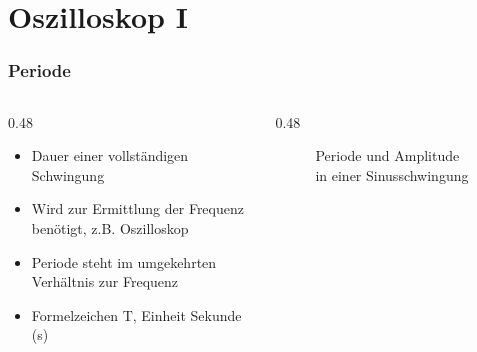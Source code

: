 
\section{Oszilloskop I}
\label{section:oszilloskop_1}
\begin{frame}%

\frametitle{Periode}
    \begin{columns}
        \begin{column}{0.48\textwidth}
            \begin{itemize}[<+->]
                \item Dauer einer vollständigen Schwingung
                \item Wird zur Ermittlung der Frequenz benötigt, z.B. Oszilloskop
                \item Periode steht im umgekehrten Verhältnis zur Frequenz
                \item Formelzeichen T, Einheit Sekunde (s)
            \end{itemize}
        \end{column}
        \begin{column}{0.48\textwidth}
            \begin{figure}
                \caption{\scriptsize Periode und Amplitude in einer Sinusschwingung}
                \label{e_periode_amplitude}
            \end{figure}
    \end{column}
    \end{columns}
\end{frame}

\begin{frame}
\end{frame}

